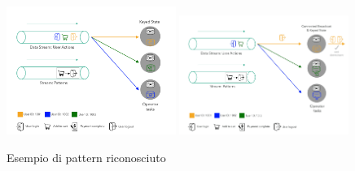 \begin{figure}[H]
    \centering
    \includegraphics[width=0.49\textwidth]{images/EventExport/broadcastState3.png}
    \includegraphics[width=0.49\textwidth]{images/EventExport/broadcastState4.png}
    \caption{Esempio di pattern riconosciuto}
    \label{fig:broadcastState3/4}
\end{figure}

